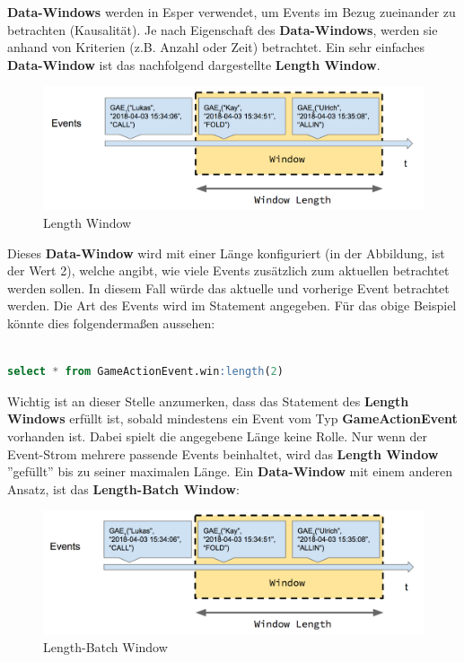 \textbf{Data-Windows} werden in Esper verwendet, um Events im Bezug zueinander zu betrachten (Kausalität). Je nach Eigenschaft des \textbf{Data-Windows}, werden sie anhand von Kriterien (z.B. Anzahl oder Zeit) betrachtet.
Ein sehr einfaches \textbf{Data-Window} ist das nachfolgend dargestellte \textbf{Length Window}.
\absatz
\begin{figure}[ht]
	\centering
	\includegraphics[width=\textwidth,height=\textheight,keepaspectratio]{images/data_window_length.png}
	\caption{Length Window}
	\label{LengthWindow}
\end{figure}
Dieses \textbf{Data-Window} wird mit einer Länge konfiguriert (in der Abbildung, ist der Wert 2), welche angibt, wie viele Events zusätzlich zum aktuellen betrachtet werden sollen. In diesem Fall würde das aktuelle und vorherige Event betrachtet werden.
Die Art des Events wird im Statement angegeben. Für das obige Beispiel könnte dies folgendermaßen aussehen:
\begin{lstlisting}[caption={Statement mit Length Window},label=length_select,captionpos=b,language=SQL]

select * from GameActionEvent.win:length(2)

\end{lstlisting}
Wichtig ist an dieser Stelle anzumerken, dass das Statement des \textbf{Length Windows} erfüllt ist, sobald mindestens ein Event vom Typ \textbf{GameActionEvent} vorhanden ist. Dabei spielt die angegebene Länge keine Rolle. Nur wenn der Event-Strom mehrere passende Events beinhaltet, wird das \textbf{Length Window} ''gefüllt'' bis zu seiner maximalen Länge.
Ein \textbf{Data-Window} mit einem anderen Ansatz, ist das \textbf{Length-Batch Window}:
\absatz
\begin{figure}[ht]
	\centering
	\includegraphics[width=\textwidth,height=\textheight,keepaspectratio]{images/data_window_length_batch.png}
	\caption{Length-Batch Window}
	\label{LengthBatchWindow}
\end{figure}
